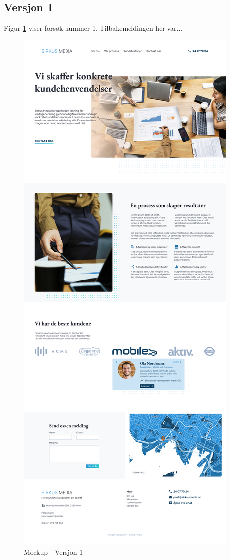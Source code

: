 \subsection{Versjon 1}
Figur \ref{fig:mockup-v1} viser forsøk nummer 1. Tilbakemeldingen her var...
\begin{figure}[H]
    \centering
    \includegraphics[width=\textwidth]{mockup1-draft3.png}
    \caption{Mockup - Versjon 1}
    \label{fig:mockup-v1}
\end{figure}


